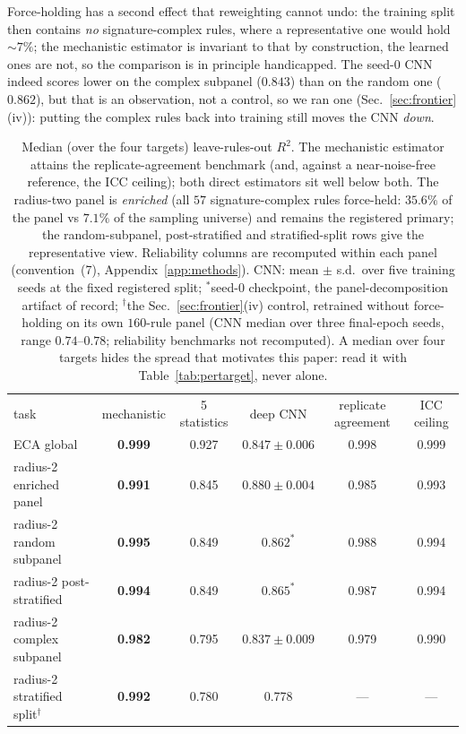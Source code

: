 \documentclass[aip,cha,amsmath,amssymb,reprint,floatfix]{revtex4-2}
\newcommand{\rtwo}{$R^2$}
\begin{document}
Force-holding has a second effect that reweighting cannot undo: the
training split then contains \emph{no} signature-complex rules, where a
representative one would hold ${\sim}7\%$; the mechanistic estimator is
invariant to that by construction, the learned ones are not, so the
comparison is in principle handicapped. The seed-0 CNN
indeed scores lower on the complex subpanel ($0.843$) than on the random one
($0.862$), but that is an observation, not a control, so we ran one
(Sec.~\ref{sec:frontier}(iv)): putting the complex rules back into training
still moves the CNN \emph{down}.

\begin{table}[t]
\centering
\begin{ruledtabular}
\begin{tabular}{lccccc}
task & mechanistic & 5 statistics & deep CNN & replicate agreement & ICC ceiling \\
\colrule
ECA global & \textbf{0.999} & 0.927 & $0.847\pm0.006$ & 0.998 & 0.999 \\
radius-2 enriched panel & \textbf{0.991} & 0.845 & $0.880\pm0.004$ & 0.985 & 0.993 \\
radius-2 random subpanel & \textbf{0.995} & 0.849 & $0.862^{\ast}$ & 0.988 & 0.994 \\
radius-2 post-stratified & \textbf{0.994} & 0.849 & $0.865^{\ast}$ & 0.987 & 0.994 \\
radius-2 complex subpanel & \textbf{0.982} & 0.795 & $0.837\pm0.009$ & 0.979 & 0.990 \\
radius-2 stratified split$^{\dagger}$ & \textbf{0.992} & 0.780 & 0.778 & --- & --- \\
\end{tabular}
\end{ruledtabular}
\caption{Median (over the four targets) leave-rules-out \rtwo{}. The
mechanistic estimator attains the replicate-agreement benchmark (and,
against a near-noise-free reference, the ICC ceiling); both direct
estimators sit well below both. The radius-two panel is \emph{enriched} (all
$57$ signature-complex rules force-held: $35.6\%$ of the panel vs $7.1\%$ of
the sampling universe) and remains the registered primary; the
random-subpanel, post-stratified and stratified-split rows give the
representative view. Reliability columns are recomputed within each panel
(convention~(7), Appendix~\ref{app:methods}). CNN: mean $\pm$ s.d.\ over
five training seeds at the fixed registered split; $^{\ast}$seed-0
checkpoint, the panel-decomposition artifact of record; $^{\dagger}$the
Sec.~\ref{sec:frontier}(iv) control, retrained without force-holding on its
own $160$-rule panel (CNN median over three final-epoch seeds, range
$0.74$--$0.78$; reliability benchmarks not recomputed). A median over four targets hides
the spread that motivates this paper: read it with
Table~\ref{tab:pertarget}, never alone.}
\label{tab:headline}
\end{table}
\end{document}
